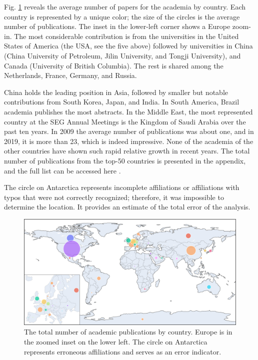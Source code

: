 \documentclass[geosciences,article,submit,moreauthors,pdftex]{Definitions/mdpi}
\begin{document}
Fig. \ref{acad_world} reveals the average number of papers for the academia by country. Each country is represented by a unique color; the size of the circles is the average number of publications. The inset in the lower-left corner shows a Europe zoom-in. The most considerable contribution is from the universities in the United States of America (the USA, see the five above) followed by universities in China (China University of Petroleum, Jilin University, and Tongji University), and Canada (University of British Columbia). The rest is shared among the Netherlands, France, Germany, and Russia.

China holds the leading position in Asia, followed by smaller but notable contributions from South Korea, Japan, and India. In South America, Brazil academia publishes the most abstracts. In the Middle East, the most represented country at the SEG Annual Meetings is the Kingdom of Saudi Arabia over the past ten years. In 2009 the average number of publications was about one, and in 2019, it is more than 23, which is indeed impressive. None of the academia of the other countries have shown such rapid relative growth in recent years. The total number of publications from the top-50 countries is presented in the appendix, and the full list can be accessed here \citep{Eltsov2020}.

The circle on Antarctica represents incomplete affiliations or affiliations with typos that were not correctly recognized; therefore, it was impossible to determine the location. It provides an estimate of the total error of the analysis.

\begin{figure}[ht!]
\centering
\includegraphics[width=\textwidth]{plottly_world3.png}
\caption{The total number of academic publications by country. Europe is in the zoomed inset on the lower left. The circle on Antarctica represents erroneous affiliations and serves as an error indicator.}
\label{acad_world}
\end{figure}
\end{document}
